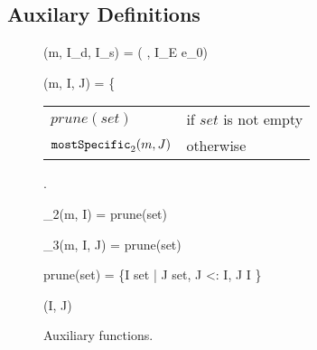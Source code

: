 \subsection{Auxilary Definitions}

\begin{figure*}[htbp]
	\begin{mathpar}
		{\mbody(m, I_d, I_s) = ( \; , I_E \; e_0)}
	
	{\mostSpecific(m, I, J) = \left\{{\begin{tabular}{ll}
				$prune(set)$ & if $set$ is not empty \\ $\texttt{mostSpecific}_2(m, J)$ & otherwise
			\end{tabular}}\right.}
		{\mostSpecific_2(m, I) = prune(set)}
	
		{\mostSpecific_3(m, I, J) = prune(set)}
	
	prune(set) = \{I \in set \; | \; \nexists J \in set, J <: I, J \neq I \}
	
	{\ext(I, J)}
	\end{mathpar}
	\caption{Auxiliary functions.}\label{fig:auxfunc}
\end{figure*}


\subsubsection{\mbody}

\begin{comment}
$mbody(m, I)$ algorithm:
\begin{itemize}
	\item If m is defined in I directly, then return I.m()
	\item Else, let $\overline{I'} = mdefined(fathers(I))$, all ancestors of $I$ that has directly defined $m()$.
	\item $\overline{I''} = needed(\overline{I'})$, keep only interfaces that are needed, which are not super-interface of others.
	\item If $\overline{I''}$ is unique, then return this unique one. Else if any two I1,I2 in $\overline{I''}$ share a parent in $\overline{I'}$, then diamond conflict is detected, report error. Else return multiple $m()$s.
\end{itemize}
\end{comment}

